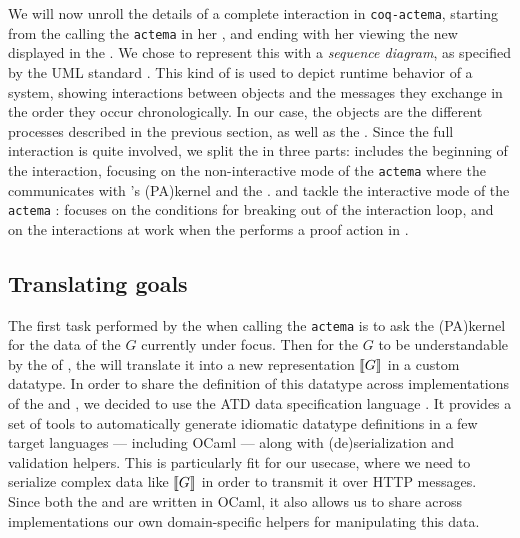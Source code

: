 We will now unroll the details of a complete interaction in \texttt{coq-actema},
starting from the  calling the \texttt{actema}  in her
, and ending with her viewing the new  displayed in the
. We chose to represent this with a \emph{sequence diagram}, as
specified by the UML standard \cite{enwiki:1153944336}. This kind of  is
used to depict runtime behavior of a system, showing interactions between
objects and the messages they exchange in the order they occur chronologically.
In our case, the objects are the different processes described in the previous
section, as well as the . Since the full interaction is quite
involved, we split the  in three parts:  includes the
beginning of the interaction, focusing on the non-interactive mode of the
\texttt{actema}  where the  communicates with 's
\kl(PA){kernel} and the .  and
 tackle the interactive mode of the \texttt{actema} :
 focuses on the conditions for breaking out of the interaction
loop, and  on the interactions at work when the 
performs a proof action in .

\subsection{Translating goals}

The first task performed by the  when calling the
\texttt{actema}  is to ask the \kl(PA){kernel} for the data of the  $G$
currently under focus. Then for the  $G$ to be understandable by the
 of , the  will translate it into a new
representation $\llbracket G \rrbracket$ in a custom datatype. In order to share the
definition of this datatype across implementations of the  and
, we decided to use the ATD data specification language
\cite{ATD}. It provides a set of tools to automatically generate idiomatic
datatype definitions in a few target languages --- including OCaml --- along
with (de)serialization and validation helpers. This is particularly fit for our
usecase, where we need to serialize complex data like $\llbracket G \rrbracket$ in order to
transmit it over HTTP messages. Since both the  and
 are written in OCaml, it also allows us to share across
implementations our own domain-specific helpers for manipulating this data.

